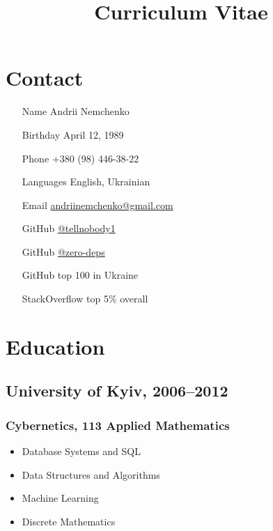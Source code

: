 


\title{Curriculum Vitae}
\author{}
\date{}
\maketitle

\section*{Contact}
\begin{multicols}{2}
\begin{itemize}
  \item[Name] Andrii Nemchenko
  \item[Birthday] April 12, 1989
  \item[Phone] +380 (98) 446-38-22
  \item[Languages] English, Ukrainian
  \item[Email] \href{mailto:andriinemchenko@gmail.com}{andriinemchenko@gmail.com}
  \item[GitHub] \href{https://github.com/tellnobody1}{@tellnobody1}
  \item[GitHub] \href{https://github.com/zero-deps}{@zero-deps}
  \item[GitHub] top 100 in Ukraine
  \item[StackOverflow] top 5\% overall
\end{itemize}
\end{multicols}

\section*{Education}

\subsection*{University of Kyiv, 2006–2012}
\subsubsection*{Cybernetics, 113 Applied Mathematics}
\begin{itemize}
  \item Database Systems and SQL
  \item Data Structures and Algorithms
  \item Machine Learning
  \item Discrete Mathematics
\end{itemize}

